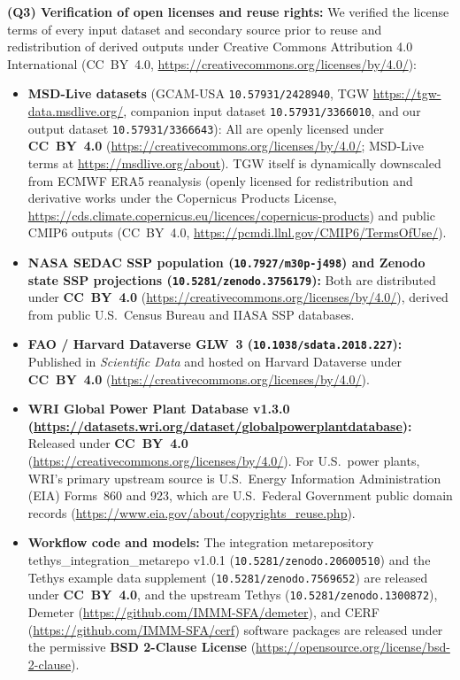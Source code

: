 \documentclass[11pt,letterpaper]{article}
\newcommand{\fname}[1]{{\ttfamily #1}}
\begin{document}
{\smallskip
\textbf{(Q3) Verification of open licenses and reuse rights:}
We verified the license terms of every input dataset and secondary source prior to reuse and redistribution of derived outputs under Creative Commons Attribution 4.0 International (CC~BY~4.0, \url{https://creativecommons.org/licenses/by/4.0/}):
\begin{itemize}[leftmargin=1.5em, topsep=2pt, itemsep=2pt]
  \item \textbf{MSD-Live datasets} (GCAM-USA \texttt{10.57931/2428940}, TGW \url{https://tgw-data.msdlive.org/}, companion input dataset \texttt{10.57931/3366010}, and our output dataset \texttt{10.57931/3366643}): All are openly licensed under \textbf{CC~BY~4.0} (\url{https://creativecommons.org/licenses/by/4.0/}; MSD-Live terms at \url{https://msdlive.org/about}). TGW itself is dynamically downscaled from ECMWF ERA5 reanalysis (openly licensed for redistribution and derivative works under the Copernicus Products License, \url{https://cds.climate.copernicus.eu/licences/copernicus-products}) and public CMIP6 outputs (CC~BY~4.0, \url{https://pcmdi.llnl.gov/CMIP6/TermsOfUse/}).
  \item \textbf{NASA SEDAC SSP population (\texttt{10.7927/m30p-j498}) and Zenodo state SSP projections (\texttt{10.5281/zenodo.3756179}):} Both are distributed under \textbf{CC~BY~4.0} (\url{https://creativecommons.org/licenses/by/4.0/}), derived from public U.S.\ Census Bureau and IIASA SSP databases.
  \item \textbf{FAO / Harvard Dataverse GLW~3 (\texttt{10.1038/sdata.2018.227}):} Published in \textit{Scientific Data} and hosted on Harvard Dataverse under \textbf{CC~BY~4.0} (\url{https://creativecommons.org/licenses/by/4.0/}).
  \item \textbf{WRI Global Power Plant Database v1.3.0 (\url{https://datasets.wri.org/dataset/globalpowerplantdatabase}):} Released under \textbf{CC~BY~4.0} (\url{https://creativecommons.org/licenses/by/4.0/}). For U.S.\ power plants, WRI's primary upstream source is U.S.\ Energy Information Administration (EIA) Forms~860 and 923, which are U.S.\ Federal Government public domain records (\url{https://www.eia.gov/about/copyrights_reuse.php}).
  \item \textbf{Workflow code and models:} The integration metarepository \fname{tethys\_\allowbreak integration\_\allowbreak metarepo} v1.0.1 (\texttt{10.5281/\allowbreak zenodo.20600510}) and the Tethys example data supplement (\texttt{10.5281/\allowbreak zenodo.7569652}) are released under \textbf{CC~BY~4.0}, and the upstream Tethys (\texttt{10.5281/\allowbreak zenodo.1300872}), Demeter (\url{https://github.com/IMMM-SFA/demeter}), and CERF (\url{https://github.com/IMMM-SFA/cerf}) software packages are released under the permissive \textbf{BSD 2-Clause License} (\url{https://opensource.org/license/bsd-2-clause}).

\end{itemize}}
\end{document}
